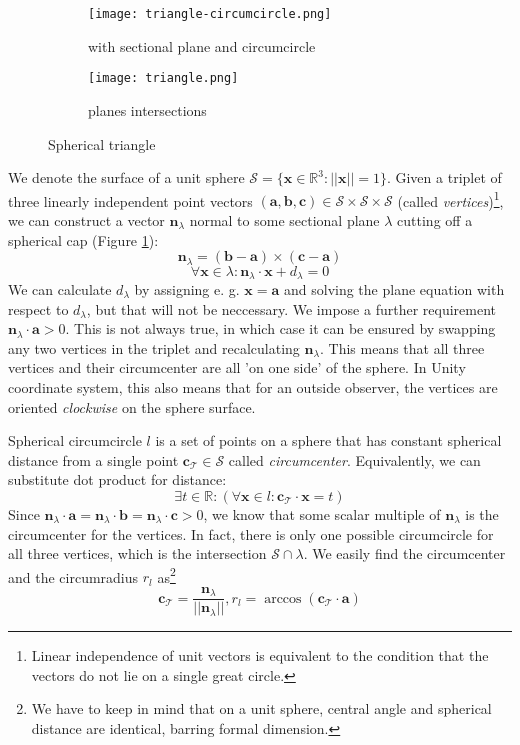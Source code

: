 \begin{figure}[ht]
\centering
\begin{subfigure}{8cm}
\texttt{[image: triangle-circumcircle.png]}
\caption{with sectional plane and circumcircle}
\label{fig:triangle-circumcircle}
\end{subfigure}
\begin{subfigure}{8cm}
\texttt{[image: triangle.png]}
\caption{planes intersections}
\label{fig:spherical-triangle-visual}
\end{subfigure}
\caption{Spherical triangle}
\label{fig:spherical-triangle}
\end{figure}

 We denote the surface of a unit sphere $\mathcal{S} =  \{\mathbf{x} \in \mathbb{R}^3: ||\mathbf{x}||=1\}$. Given a triplet of three linearly independent point vectors $(\mathbf{a},\mathbf{b},\mathbf{c})\in \mathcal{S}\times\mathcal{S}\times\mathcal{S}$ (called \textit{vertices})\footnote{Linear independence of unit vectors is equivalent to the condition that the vectors do not lie on a single great circle.}, we can construct a vector $\mathbf{n}_\lambda$ normal to some sectional plane $\lambda$ cutting off a spherical cap (Figure \ref{fig:triangle-circumcircle}):
 $$\mathbf{n}_\lambda=(\mathbf{b} - \mathbf{a})\times(\mathbf{c} - \mathbf{a})$$
$$\forall\mathbf{x}\in\lambda: \mathbf{n}_\lambda\cdot\mathbf{x}+d_\lambda=0$$
We can calculate $d_\lambda$ by assigning e. g. $\mathbf{x}=\mathbf{a}$ and solving the plane equation with respect to $d_\lambda$, but that will not be neccessary. We impose a further requirement $\mathbf{n}_\lambda\cdot\mathbf{a}>0$. This is not always true, in which case it can be ensured by swapping any two vertices in the triplet and recalculating $\mathbf{n}_\lambda$. This means that all three vertices and their circumcenter are all 'on one side' of the sphere. In Unity coordinate system, this also means that for an outside observer, the vertices are oriented \textit{clockwise} on the sphere surface.

Spherical circumcircle $l$ is a set of points on a sphere that has constant spherical distance from a single point $\mathbf{c}_\mathcal{T}\in\mathcal{S}$ called \textit{circumcenter}. Equivalently, we can substitute dot product for distance:
$$\exists t\in\mathbb{R}:(\forall\mathbf{x}\in l:\mathbf{c}_\mathcal{T}\cdot\mathbf{x}=t)$$
Since $\mathbf{n}_\lambda\cdot\mathbf{a}=\mathbf{n}_\lambda\cdot\mathbf{b}=\mathbf{n}_\lambda\cdot\mathbf{c}>0$, we know that some scalar multiple of $\mathbf{n}_\lambda$ is the circumcenter for the vertices. In fact, there is only one possible circumcircle for all three vertices, which is the intersection $\mathcal{S}\cap\lambda$. We easily find the circumcenter and the circumradius $r_l$ as\footnote{We have to keep in mind that on a unit sphere, central angle and spherical distance are identical, barring formal dimension.}
$$\mathbf{c}_\mathcal{T}=\frac{\mathbf{n}_\lambda}{||\mathbf{n}_\lambda||}, r_l=\arccos(\mathbf{c}_\mathcal{T}\cdot\mathbf{a})$$

